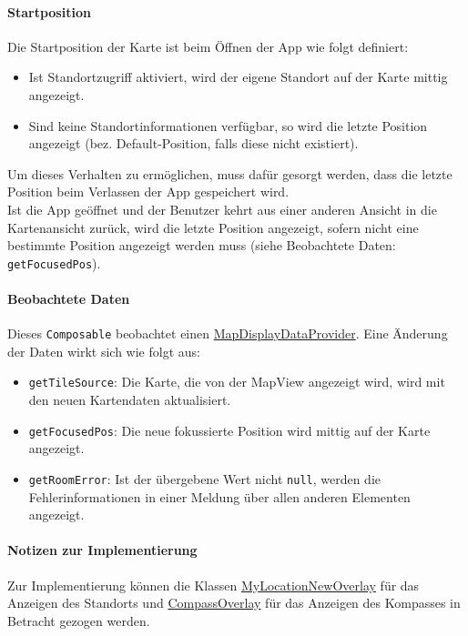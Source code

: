 \paragraph*{Startposition}
Die Startposition der Karte ist beim Öffnen der App wie folgt definiert:
\begin{itemize}
    \item Ist Standortzugriff aktiviert, wird der eigene Standort auf der Karte mittig angezeigt.
    \item Sind keine Standortinformationen verfügbar, so wird die letzte Position angezeigt 
    (bez. Default-Position, falls diese nicht existiert).
\end{itemize}
Um dieses Verhalten zu ermöglichen, muss dafür gesorgt werden, dass die letzte Position beim Verlassen 
der App gespeichert wird.\\
Ist die App geöffnet und der Benutzer kehrt aus einer anderen Ansicht in die \Gls{Kartenansicht} zurück,
wird die letzte Position angezeigt, sofern nicht eine bestimmte Position angezeigt werden muss 
(siehe Beobachtete Daten: \texttt{getFocusedPos}).

\paragraph*{Beobachtete Daten}
Dieses \texttt{Composable} beobachtet einen \hyperref[App_Map_ViewModel_MapDisplayDataProvider]{MapDisplayDataProvider}. 
Eine Änderung der Daten wirkt sich wie folgt aus:
\begin{itemize}
    \item \texttt{getTileSource}: Die Karte, die von der MapView angezeigt wird, wird mit den neuen 
    Kartendaten aktualisiert.
    \item \texttt{getFocusedPos}: Die neue fokussierte Position wird mittig auf der Karte angezeigt.
    \item \texttt{getRoomError}: Ist der übergebene Wert nicht \texttt{null}, werden die Fehlerinformationen 
    in einer Meldung über allen anderen Elementen angezeigt.
\end{itemize}

\paragraph*{Notizen zur Implementierung}
Zur Implementierung können die Klassen \href{https://osmdroid.github.io/osmdroid/javadocs/osmdroid-android/debug/org/osmdroid/views/overlay/mylocation/MyLocationNewOverlay.html}
{MyLocationNewOverlay} für das Anzeigen des Standorts und \href{https://osmdroid.github.io/osmdroid/javadocs/osmdroid-android/debug/org/osmdroid/views/overlay/compass/CompassOverlay.html}
{CompassOverlay} für das Anzeigen des Kompasses in Betracht gezogen werden.

